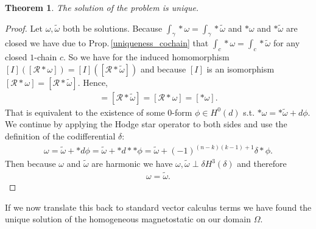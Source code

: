 \documentclass[12pt,a4paper]{article}
\newtheorem{theorem}{Theorem}
\theoremstyle{definition}
\newcommand{\real}{\mathbb{R}}
\newcommand{\rop}{\mathscr{R}} %
\begin{document}
\begin{theorem}
    The solution of the problem is unique.
\end{theorem}
\begin{proof}
    Let $\omega, \tilde{\omega}$ both be solutions. 
    Because $\int_\gamma *\omega = \int_\gamma *\tilde{\omega}$ and $*\omega$ and
    $*\tilde{\omega}$ are closed we have due to Prop.\,\ref{uniqueness_cochain} %
    that $\int_c *\omega = \int_c *\tilde{\omega}$ for any closed $1$-chain $c$.
    So we have for the induced homomorphism $[I]([\rop *\omega]) = 
    [I]([\rop *\tilde{\omega}])$ and because $[I]$ is an isomorphism 
    $[\rop *\omega] = [\rop *\tilde{\omega}]$. Hence,
    \begin{align*}
    [*\tilde{\omega}] = [\rop *\tilde{\omega}] = 
    [\rop *\omega] = [*\omega].
    \end{align*}
    That is equivalent to the
    existence of some $0$-form $\phi \in H^0(d)$ s.t.
    $*\omega = *\tilde{\omega} + d\phi$. We continue by applying the Hodge
    star operator to both sides and use the definition of the codifferential 
    $\delta$:
    \begin{align*}
        \omega = \tilde{\omega} + *d\phi = \tilde{\omega} + *d**\phi 
        = \tilde{\omega} + (-1)^{(n-k)(k-1)+1}\delta * \phi.
    \end{align*}
    Then because $\omega$ and 
    $\tilde{\omega}$ are harmonic we have 
    $\omega, \tilde{\omega} \perp \delta H^{3}(\delta)$ and therefore 
    \begin{align*}
    \omega = \tilde{\omega}.    
    \end{align*}
\end{proof}
If we now translate this back to standard vector calculus terms we have found 
the unique solution of the homogeneous magnetostatic on our domain $\Omega$.


\end{document}
